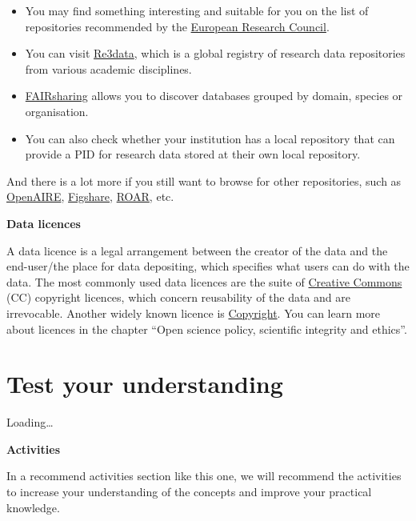 \documentclass[
]{book}
\begin{document}
\begin{itemize}
\item
  You may find something interesting and suitable for you on the list of repositories recommended by the \href{https://erc.europa.eu/funding-and-grants/managing-project/open-access}{European Research Council}.
\item
  You can visit \href{https://www.re3data.org/}{Re3data}, which is a global registry of research data repositories from various academic disciplines.
\item
  \href{https://fairsharing.org/search?fairsharingRegistry=Database}{FAIRsharing} allows you to discover databases grouped by domain, species or organisation.
\item
  You can also check whether your institution has a local repository that can provide a PID for research data stored at their own local repository.
\end{itemize}

And there is a lot more if you still want to browse for other repositories, such as \href{https://explore.openaire.eu/participate/deposit/learn-how}{OpenAIRE}, \href{https://figshare.com/}{Figshare}, \href{http://roar.eprints.org/}{ROAR}, etc.

\textbf{Data licences}

A data licence is a legal arrangement between the creator of the data and the end-user/the place for data depositing, which specifies what users can do with the data. The most commonly used data licences are the suite of \href{https://en.wikipedia.org/wiki/Creative_Commons}{Creative Commons} (CC) copyright licences, which concern reusability of the data and are irrevocable. Another widely known licence is \href{https://en.wikipedia.org/wiki/Copyright}{Copyright}. You can learn more about licences in the chapter ``Open science policy, scientific integrity and ethics''.

\hypertarget{test-your-understanding-5}{%
\section{Test your understanding}\label{test-your-understanding-5}}

Loading\ldots{}

\textbf{Activities}

In a recommend activities section like this one, we will recommend the activities to increase your understanding of the concepts and improve your practical knowledge.
\end{document}
